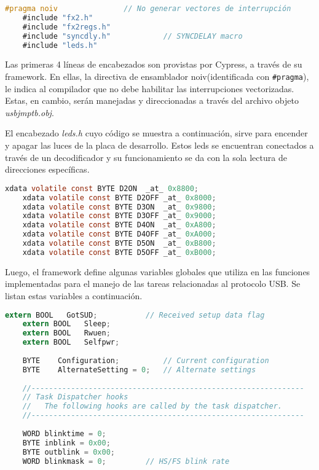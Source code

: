 	\begin{lstlisting}[language=C,backgroundcolor=\color{gray!30}]
	#pragma noiv               // No generar vectores de interrupción
	#include "fx2.h"
	#include "fx2regs.h"
	#include "syncdly.h"            // SYNCDELAY macro
	#include "leds.h"
	\end{lstlisting}
	
	Las primeras 4 líneas de encabezados son provistas por Cypress, a través de su framework. En ellas, la directiva de ensamblador noiv(identificada con \verb|#pragma|), le indica al compilador que no debe habilitar las interrupciones vectorizadas. Estas, en cambio, serán manejadas y direccionadas a través del archivo objeto {\it usbjmptb.obj}.%
	
	El encabezado {\it leds.h} cuyo código se muestra a continuación, sirve para encender y apagar las luces de la placa de desarrollo. Estos leds se encuentran conectados a través de un decodificador y su funcionamiento se da con la sola lectura de direcciones específicas.
	
	\begin{lstlisting}[language=C,backgroundcolor=\color{gray!30}]
	xdata volatile const BYTE D2ON	_at_ 0x8800;
	xdata volatile const BYTE D2OFF	_at_ 0x8000;
	xdata volatile const BYTE D3ON	_at_ 0x9800;
	xdata volatile const BYTE D3OFF	_at_ 0x9000;
	xdata volatile const BYTE D4ON	_at_ 0xA800;
	xdata volatile const BYTE D4OFF	_at_ 0xA000;
	xdata volatile const BYTE D5ON	_at_ 0xB800;
	xdata volatile const BYTE D5OFF	_at_ 0xB000;	\end{lstlisting}
	
	Luego, el framework define algunas variables globales que utiliza en las funciones implementadas para el manejo de las tareas relacionadas al protocolo USB. Se listan estas variables a continuación.
	
	\begin{lstlisting}[language=C,backgroundcolor=\color{gray!30}]
	extern BOOL   GotSUD;			// Received setup data flag
	extern BOOL   Sleep;
	extern BOOL   Rwuen;
	extern BOOL   Selfpwr;
	
	BYTE    Configuration;      	// Current configuration
	BYTE    AlternateSetting = 0;   // Alternate settings
	
	//--------------------------------------------------------------
	// Task Dispatcher hooks
	//   The following hooks are called by the task dispatcher.
	//--------------------------------------------------------------
	
	WORD blinktime = 0;
	BYTE inblink = 0x00;
	BYTE outblink = 0x00;
	WORD blinkmask = 0;			// HS/FS blink rate
	\end{lstlisting}
	
